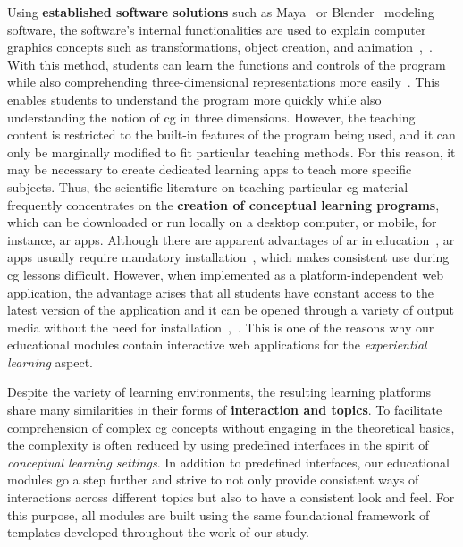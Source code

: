 Using \textbf{established software solutions} such as Maya~\cite{maya:2024:software} or Blender~\cite{blender:2024:documentation} modeling software, the software's internal functionalities are used to explain computer graphics concepts such as transformations, object creation, and animation~\cite{Elyan:2012:cg-tool},~\cite{Kadam:2013:cg-tool}. With this method, students can learn the functions and controls of the program while also comprehending three-dimensional representations more easily~\cite{Kadam:2013:cg-tool}. This enables students to understand the program more quickly while also understanding the notion of \acrshort{cg} in three dimensions. However, the teaching content is restricted to the built-in features of the program being used, and it can only be marginally modified to fit particular teaching methods. For this reason, it may be necessary to create dedicated learning apps to teach more specific subjects. Thus, the scientific literature on teaching particular \acrshort{cg} material frequently concentrates on the \textbf{creation of conceptual learning programs}, which can be downloaded or run locally on a desktop computer, or mobile, for instance, \acrfull{ar} apps.
Although there are apparent advantages of \acrshort{ar} in education~\cite{wu:2013:current}\cite{lilligreen:2019:AWI}\cite{lilligreen:2019:EuroVR}, \acrshort{ar} apps usually require mandatory installation~\cite{Qiao:2019:disadvantage-of-ar}, which makes consistent use during \acrshort{cg} lessons difficult. However, when implemented as a platform-independent web application, the advantage arises that all students have constant access to the latest version of the application and it can be opened through a variety of output media without the need for installation~\cite{Eisemann:2023:cg-tool},~\cite{angel:2017:interactive}.  This is one of the reasons why our educational modules contain interactive web applications for the \emph {experiential learning} aspect.


Despite the variety of learning environments, the resulting learning platforms share many similarities in their forms of \textbf{interaction and topics}. To facilitate comprehension of complex \acrshort{cg} concepts without engaging in the theoretical basics, the complexity is often reduced by using predefined interfaces in the spirit of \emph{conceptual learning settings}. In addition to predefined interfaces, our educational modules go a step further and strive to not only provide consistent ways of interactions across different topics but also to have a consistent look and feel. For this purpose, all modules are built using the same foundational framework of templates developed throughout the work of our study.

